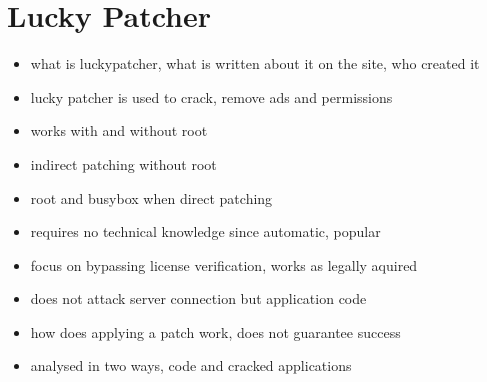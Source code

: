 \section{Lucky Patcher} \label{section:luckypatcher-explain}
\begin{itemize}
  \item what is luckypatcher, what is written about it on the site, who created it
  \item lucky patcher is used to crack, remove ads and permissions
  \item works with and without root
  \item indirect patching without root
  \item root and busybox when direct patching
  \item requires no technical knowledge since automatic, popular
  \item focus on bypassing license verification, works as legally aquired
  \item does not attack server connection but application code
  \item how does applying a patch work, does not guarantee success
  \item analysed in two ways, code and cracked applications
\end{itemize}

